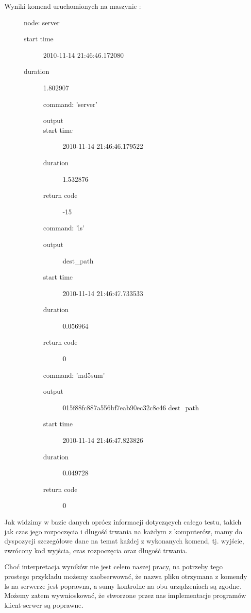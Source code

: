 \documentclass[00-praca-magisterska.tex]{subfiles}
\begin{document}
Wyniki komend uruchomionych na maszynie :
\begin{description}
\item[]
  node: server
  \begin{description}
  \item[start time] 2010-11-14 21:46:46.172080
  \item[duration] 1.802907
  \item[]
    command: 'server'
    \begin{description}
      \item[output] 
      \item[start time] 2010-11-14 21:46:46.179522
      \item[duration] 1.532876
      \item[return code] -15
    \end{description}
  \item[]
    command: 'ls'
    \begin{description}
      \item[output] dest\_path
      \item[start time] 2010-11-14 21:46:47.733533
      \item[duration] 0.056964
      \item[return code] 0
    \end{description}
  \item[]
    command: 'md5sum'
    \begin{description}
      \item[output] 015f88fc887a556bf7eab90ec32c8c46  dest\_path
      \item[start time] 2010-11-14 21:46:47.823826
      \item[duration] 0.049728
      \item[return code] 0
    \end{description}
  \end{description}
\end{description}

Jak widzimy w bazie danych oprócz informacji dotyczących całego testu, takich
jak czas jego rozpoczęcia i długość trwania na każdym z komputerów, mamy do
dyspozycji szczegółowe dane na temat każdej z wykonanych komend, tj. wyjście,
zwrócony kod wyjścia, czas rozpoczęcia oraz długość trwania.

Choć interpretacja wyników nie jest celem naszej pracy, na potrzeby tego prostego
przykładu możemy zaobserwować, że nazwa pliku otrzymana z komendy ls na serwerze
jest poprawna, a sumy kontrolne na obu urządzeniach są zgodne. Możemy zatem
wywnioskować, że stworzone przez nas implementacje programów klient-serwer są
poprawne.
\end{document}
